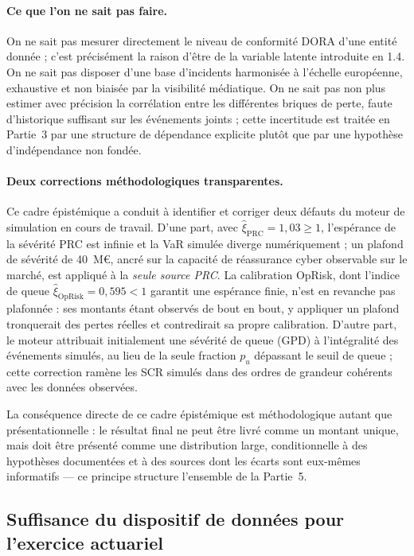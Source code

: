 \documentclass[11pt,a4paper]{article}
\theoremstyle{navystyle}
\theoremstyle{navydef}
\begin{document}
\paragraph{Ce que l'on ne sait pas faire.} On ne sait pas mesurer directement
le niveau de conformité DORA d'une entité donnée ; c'est précisément la
raison d'être de la variable latente introduite en 1.4. On ne sait pas
disposer d'une base d'incidents harmonisée à l'échelle européenne, exhaustive
et non biaisée par la visibilité médiatique. On ne sait pas non plus estimer
avec précision la corrélation entre les différentes briques de perte,
faute d'historique suffisant sur les événements joints ; cette incertitude
est traitée en Partie~3 par une structure de dépendance explicite plutôt que
par une hypothèse d'indépendance non fondée.

\paragraph{Deux corrections méthodologiques transparentes.} Ce cadre
épistémique a conduit à identifier et corriger deux défauts du moteur de
simulation en cours de travail. D'une part, avec $\hat{\xi}_{\text{PRC}} =
1{,}03 \geq 1$, l'espérance de la sévérité PRC est infinie et la VaR simulée
diverge numériquement ; un plafond de sévérité de 40~M\euro, ancré sur la
capacité de réassurance cyber observable sur le marché, est appliqué à la
\emph{seule source PRC}. La calibration OpRisk, dont l'indice de queue
$\hat{\xi}_{\text{OpRisk}} = 0{,}595 < 1$ garantit une espérance finie, n'est
en revanche pas plafonnée : ses montants étant observés de bout en bout, y
appliquer un plafond tronquerait des pertes réelles et contredirait sa propre
calibration. D'autre part, le moteur attribuait initialement une sévérité de
queue (GPD) à l'intégralité des événements simulés, au lieu de la seule
fraction $p_u$ dépassant le seuil de queue ; cette correction ramène les SCR
simulés dans des ordres de grandeur cohérents avec les données observées.

La conséquence directe de ce cadre épistémique est méthodologique autant que
présentationnelle : le résultat final ne peut être livré comme un montant
unique, mais doit être présenté comme une distribution large, conditionnelle
à des hypothèses documentées et à des sources dont les écarts sont eux-mêmes
informatifs --- ce principe structure l'ensemble de la Partie~5.

\subsection{Suffisance du dispositif de données pour l'exercice actuariel}
\end{document}
